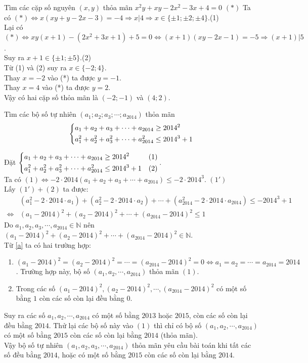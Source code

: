\begin{ex}%
	Tìm các cặp số nguyên $\left(x, y\right)$ thỏa mãn $x^2y + xy - 2x^2 - 3x + 4 = 0$ \hfill $(*)$
	\loigiai
	{
		Ta có $(*)\Leftrightarrow x(xy+y-2x-3)=-4\Rightarrow x|4\Rightarrow x\in\{\pm1;\pm2;\pm4\}$.\hfill(1)\\
		Lại có $(*)\Leftrightarrow xy(x+1)-(2x^2+3x+1)+5=0\Leftrightarrow(x+1)(xy-2x-1)=-5\Rightarrow (x+1)|5$.\\
		Suy ra $x+1\in\{\pm1;\pm 5\}$.\hfill(2)\\
		Từ (1) và (2) suy ra $x\in\{-2;4\}$.\\
		Thay $x=-2$ vào (*) ta được $y=-1$.\\
		Thay $x=4$ vào (*) ta được $y=2$.\\
		Vậy có hai cặp số thỏa mãn là $(-2;-1)$ và $(4;2)$.
	}
\end{ex}

\begin{ex}%
	Tìm các bộ số tự nhiên $\left(a_1; a_2; a_3;\cdots; a_{2014}\right)$ thỏa mãn
	$$\left\{\begin{aligned}
	&a_1+  a_2 +  a_3 + \cdots +  a_{2014}\geq 2014^2\\
	&a^2_1+  a^2_2 +  a^2_3 + \cdots +  a^2_{2014}\leq 2014^3 + 1\end{aligned}\right.$$
	\loigiai
	{
		Đặt	$\left\{\begin{aligned}
		&a_1+  a_2 +  a_3 + \cdots +  a_{2014}\ge 2014^2  &(1)\\
		&a^2_1+  a^2_2 +  a^2_3 + \cdots +  a^2_{2014}\le 2014^3 + 1 &(2)\end{aligned}\right.$. \\
		Ta có $(1)\Leftrightarrow -2 \cdot 2014 \left(a_1+a_2+a_3+\cdots +a_{2014}\right) \le -2 \cdot 2014^3$. \hfill $(1')$\\
		Lấy $(1')+(2)$  ta được:
		\begin{align*}
			&\left(a_1^2-2 \cdot 2014 \cdot a_1\right)+ \left(a_2^2-2 \cdot 2014 \cdot a_2\right)+\cdots+\left(a_{2014}^2-2 \cdot 2014 \cdot a_{2014}\right)\le-2014^3+1 \\
			\Leftrightarrow &(a_1-2014)^2+(a_2-2014)^2+\cdots+(a_{2014}-2014)^2\le 1 \tag{3} \label{a}
		\end{align*}
		Do $a_1,a_2,a_3,\cdots,a_{2014} \in \mathbb{N}$ nên $(a_1-2014)^2+(a_2-2014)^2+\cdots+(a_{2014}-2014)^2 \in \mathbb{N}$.\\
		Từ \eqref{a} ta có hai trường hợp:
		\begin{enumerate}[\bfseries TH1:]
			\item $(a_1-2014)^2=(a_2-2014)^2=\cdots=(a_{2014}-2014)^2=0\Leftrightarrow a_1=a_2=\cdots=a_{2014}=2014$. Trường hợp này, bộ số $\left(a_1,a_2,\cdots,a_{2014}\right)$ thỏa mãn $(1)$.
			\item Trong các số $(a_1-2014)^2,(a_2-2014)^2,\cdots,(a_{2014}-2014)^2$ có một số bằng $1$ còn các số còn lại đều bằng $0$.
		\end{enumerate}
		Suy ra các số $a_1,a_2,\cdots,a_{2014}$ có một số bằng $2013$ hoặc $2015$, còn các số còn lại đều bằng $2014$.
		Thử lại các bộ số này vào $(1)$ thì chỉ có bộ số $\left(a_1,a_2,\cdots,a_{2014}\right)$ có một số bằng $2015$ còn các số còn lại bằng $2014$ (thỏa mãn).\\
		Vậy bộ số tự nhiên $\left(a_1,a_2,a_3,\cdots,a_{2014}\right)$ thỏa mãn yêu cầu bài toán khi tất các số đều bằng $2014$, hoặc có một số bằng $2015$ còn các số còn lại bằng $2014$.
	}
\end{ex}
	
